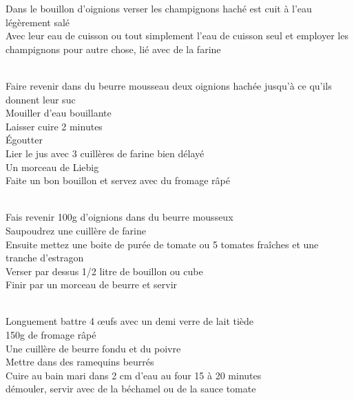 \begin{minipage}[c]{\textwidth}
Dans le bouillon d'oignions verser les champignons haché est cuit à l'eau légèrement salé\\
Avec leur eau de cuisson ou tout simplement l'eau de cuisson seul et employer les champignons pour autre chose, lié avec de la farine\\
\\

\end{minipage}

\begin{minipage}[c]{\textwidth}
Faire revenir dans du beurre mousseau deux oignions hachée jusqu'à ce qu'ils donnent leur suc\\
Mouiller d'eau bouillante\\
Laisser cuire 2 minutes\\
Égoutter\\
Lier le jus avec 3 cuillères de farine bien délayé\\
Un morceau de Liebig\\
Faite un bon bouillon et servez avec du fromage râpé\\
\\

\end{minipage}

\begin{minipage}[c]{\textwidth}
Fais revenir 100g d'oignions dans du beurre mousseux\\
Saupoudrez une cuillère de farine\\
Ensuite mettez une boite de purée de tomate ou 5 tomates fraîches et une tranche d'estragon\\
Verser par dessus 1/2 litre de bouillon ou cube\\
Finir par un morceau de beurre et servir\\
\\

\end{minipage}

\begin{minipage}[c]{\textwidth}
Longuement battre 4 œufs avec un demi verre de lait tiède\\
150g de fromage râpé\\
Une cuillère de beurre fondu et du poivre\\
Mettre dans des ramequins beurrés\\
Cuire au bain mari dans 2 cm d'eau au four 15 à 20 minutes\\
démouler, servir avec de la béchamel ou de la sauce tomate\\
\\

\end{minipage}


